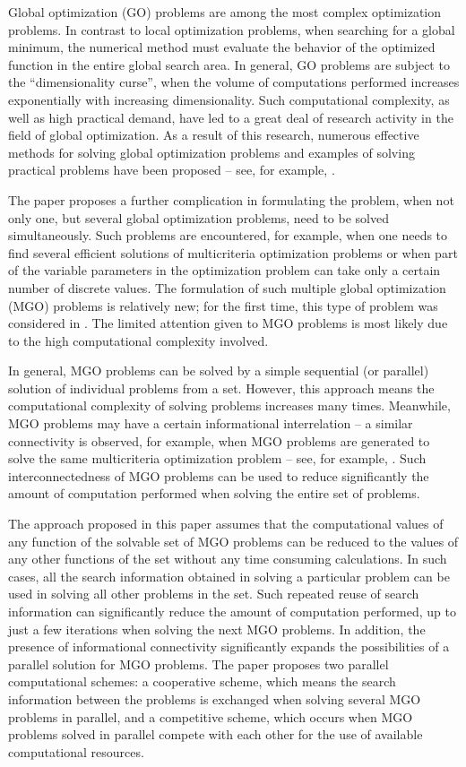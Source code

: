 \documentclass[review]{elsarticle}
\begin{document}
Global optimization (GO) problems are among the most complex optimization problems. In contrast to local optimization problems, when searching for a global minimum, the numerical method must evaluate the behavior of the optimized function in the entire global search area. In general, GO problems are subject to the ``dimensionality curse'', when the volume of computations performed increases exponentially with increasing dimensionality. Such computational complexity, as well as high practical demand, have led to a great deal of research activity in the field of global optimization. As a result of this research, numerous effective methods for solving global optimization problems and examples of solving practical problems have been proposed -- see, for example, \cite{c1,c2,c3,c4,c5,c6,c7,c8,c9,c10,c11,c12,c13,c14,c18}.

The paper proposes a further complication in formulating the problem, when not only one, but several global optimization problems, need to be solved simultaneously. Such problems are encountered, for example, when one needs to find several efficient solutions of multicriteria optimization problems or when part of the variable parameters in the optimization problem can take only a certain number of discrete values. The formulation of such multiple global optimization (MGO) problems is relatively new; for the first time, this type of problem was considered in \cite{c15,c16,c17}. The limited attention given to MGO problems is most likely due to the high computational complexity involved.

In general, MGO problems can be solved by a simple sequential (or parallel) solution of individual problems from a set. However, this approach means the computational complexity of solving problems increases many times. Meanwhile, MGO problems may have a certain informational interrelation -- a similar connectivity is observed, for example, when MGO problems are generated to solve the same multicriteria optimization problem -- see, for example, \cite{c19,c20}. Such interconnectedness of MGO problems can be used to reduce significantly the amount of computation performed when solving the entire set of problems.

The approach proposed in this paper assumes that the computational values of any function of the solvable set of MGO problems can be reduced to the values of any other functions of the set without any time consuming calculations. In such cases, all the search information obtained in solving a particular problem can be used in solving all other problems in the set. Such repeated reuse of search information can significantly reduce the amount of computation performed, up to just a few iterations when solving the next MGO problems. In addition, the presence of informational connectivity significantly expands the possibilities of a parallel solution for MGO problems. The paper proposes two parallel computational schemes: a cooperative scheme, which means the search information between the problems is exchanged when solving several MGO problems in parallel, and a competitive scheme, which occurs when MGO problems solved in parallel compete with each other for the use of available computational resources.
\end{document}
